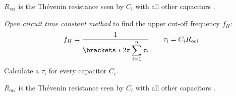 \begin{CheatsheetEntryFrame}
\begin{MulticolsSoftSepRule}{2}
        $R_{sci}$ is the Th\'evenin resistance seen by $C_i$ \linebreak with all other capacitors \textbf{}.

        \bigskip
        \SoftHLine
        \bigskip


        \emph{Open circuit time constant method} to find the \linebreak upper cut-off frequency $f_H$:
        \begin{gather*}
            f_H
            = \frac{1}{
                \displaystyle
                \brackets*{
                    2 \pi \sum_{i=1}^n \tau_i
                }
            }
            \qquad
            \tau_i = C_i R_{oci}
        \end{gather*}
        Calculate a $\tau_i$ for every capacitor $C_i$.

        $R_{oci}$ is the Th\'evenin resistance seen by $C_i$ \linebreak with all other capacitors \textbf{}.
        
    \end{MulticolsSoftSepRule}
\end{CheatsheetEntryFrame}

